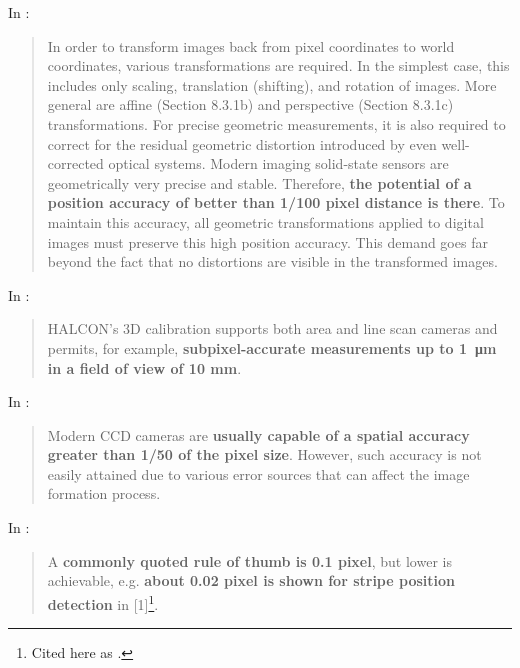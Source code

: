 \documentclass[a4paper,12pt]{article}
\begin{document}
In \cite[section 8.2, p.270]{Jahne:2004:PHI:983100}:
\begin{quotation}
In order to transform images back from pixel coordinates to world coordinates,
various transformations are required. In the simplest case, this
includes only scaling,
translation (shifting), and rotation of images. More general are
affine (Section 8.3.1b)
and perspective (Section 8.3.1c) transformations. For precise
geometric measurements,
it is also required to correct for the residual geometric distortion
introduced by even
well-corrected optical systems. Modern imaging solid-state sensors are
geometrically
very precise and stable. Therefore, \textbf{the potential of a position
accuracy of better than
1/100 pixel distance is there}. To maintain this accuracy, all
geometric transformations
applied to digital images must preserve this high position accuracy.
This demand goes
far beyond the fact that no distortions are visible in the transformed images.
\end{quotation}

In \cite{halcon}:
\begin{quotation}
HALCON’s 3D calibration supports both area and line scan cameras and
permits, for example, \textbf{subpixel-accurate measurements up to \SI{1}{\micro\metre} in a field of
view of 10 mm}.
\end{quotation}

In \cite{Heikkila:2000:GCC:354167.354171}:
\begin{quotation}
Modern CCD cameras are \textbf{usually capable of a spatial accuracy greater than 1/50 of the pixel
size}. However, such accuracy is not easily attained due to various error sources that can affect
the image formation process.
\end{quotation}

In \cite{Fisher}:
\begin{quotation}
A \textbf{commonly quoted rule of thumb is 0.1 pixel}, but lower is achievable, e.g. \textbf{about 0.02 pixel is shown for stripe position detection} in [1]\footnote{Cited here as \cite{doi:10.1117/12.55947}.}.
\end{quotation}
\end{document}
